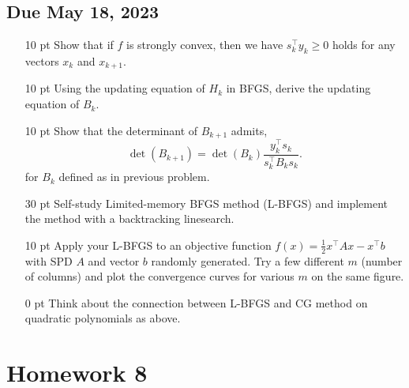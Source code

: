 \subsection*{Due May 18, 2023}
\begin{enumerate}[label=\textbf{Problem \arabic*.}]
    \item [10 pt] Show that if \(f\) is strongly convex, then we have \(s_{k}^{\top}y_{k}\geq 0\) holds for any vectors \(x_{k}\) and \(x_{k+1}\).
    \item [10 pt] Using the updating equation of \(H_{k}\) in BFGS, derive the updating equation of \(B_{k}\).
    \item [10 pt] Show that the determinant of \(B_{k+1}\) admits,
    \[\det(B_{k+1})=\det(B_{k})\frac{y_{k}^{\top}s_{k}}{s_{k}^{\top}B_{k}s_{k}}.\]
    for \(B_{k}\) defined as in previous problem.
    \item [30 pt] Self-study Limited-memory BFGS method (L-BFGS) and implement the method with a backtracking linesearch.
    \item [10 pt] Apply your L-BFGS to an objective function \(f(x)=\frac{1}{2}x^{\top}Ax-x^{\top}b\) with SPD \(A\) and vector \(b\) randomly generated. Try a few different \(m\) (number of columns) and plot the convergence curves for various \(m\) on the same figure.
    \item [0 pt] Think about the connection between L-BFGS and CG method on quadratic polynomials as above.
\end{enumerate}

\section{Homework 8}
